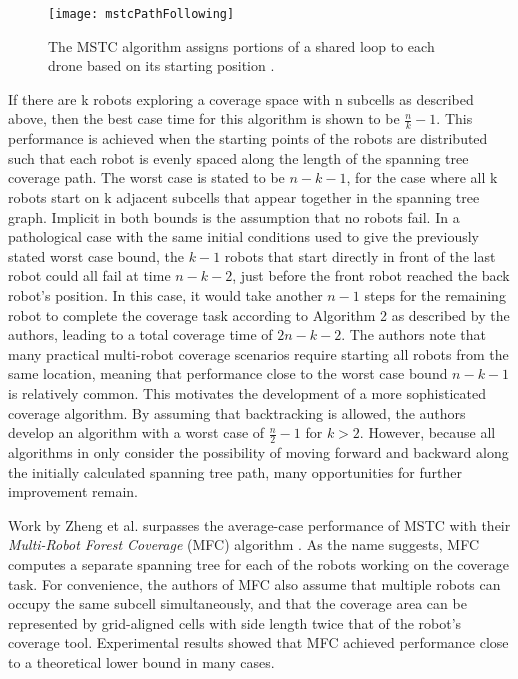\begin{figure}[H]
\texttt{[image: mstcPathFollowing]}
\caption[MSTC Path Following Behavior]{The MSTC algorithm assigns portions of a shared loop to each drone based on its starting position \cite{Hazon}.}
\end{figure}

If there are k robots exploring a coverage space with n subcells as described above, then the best case time for this algorithm is shown to be $ \frac{n}{k} - 1 $. This performance is achieved when the starting points of the robots are distributed such that each robot is evenly spaced along the length of the spanning tree coverage path. The worst case is stated to be $ n - k - 1$, for the case where all k robots start on k adjacent subcells that appear together in the spanning tree graph. Implicit in both bounds is the assumption that no robots fail. In a pathological case with the same initial conditions used to give the previously stated worst case bound, the $ k - 1$ robots that start directly in front of the last robot could all fail at time $ n - k - 2$, just before the front robot reached the back robot's position. In this case, it would take another $n - 1$  steps for the remaining robot to complete the coverage task according to Algorithm 2 as described by the authors, leading to a total coverage time of $ 2 n - k - 2 $. The authors note that many practical multi-robot coverage scenarios require starting all robots from the same location, meaning that performance close to the worst case bound $ n - k - 1 $ is relatively common. This motivates the development of a more sophisticated coverage algorithm. By assuming that backtracking is allowed, the authors develop an algorithm with a worst case of $ \frac{n}{2} - 1 $ for $ k > 2 $. However, because all algorithms in \cite{Hazon} only consider the possibility of moving forward and backward along the initially calculated spanning tree path, many opportunities for further improvement remain.

Work by Zheng et al. surpasses the average-case performance of MSTC with their \textit{Multi-Robot Forest Coverage} (MFC) algorithm \cite{Zheng}. As the name suggests, MFC computes a separate spanning tree for each of the robots working on the coverage task. For convenience, the authors of MFC also assume that multiple robots can occupy the same subcell simultaneously, and that the coverage area can be represented by grid-aligned cells with side length twice that of the robot's coverage tool. Experimental results showed that MFC achieved performance close to a theoretical lower bound in many cases.

